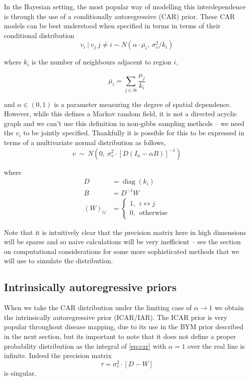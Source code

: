 \documentclass[11pt]{report}
\begin{document}
In the Bayesian setting, the most popular way of modelling this interdependence is through the use of a conditionally autoregressive (CAR) prior. These CAR models can be best understood when specified in terms in terms of their conditional distribution
\begin{equation}
v_i \ | \ v_j \ j \neq i \sim N(\alpha \cdot \bar{\mu_i}, \ \sigma_v^2/k_i)
\end{equation}

where $k_i$ is the number of neighbours adjacent to region $i$,

\begin{equation}
\bar{\mu}_i = \sum_{j \in \partial i} \frac{\mu_j}{k_i}
\end{equation}

and $\alpha \in (0, 1)$ is a parameter measuring the degree of spatial dependence. \\

However, while this defines a Markov random field, it is not a directed acyclic graph and we can't use this definition in non-gibbs sampling methods -- we need the $v_i$ to be jointly specified. Thankfully it is possible \citep{banerjeebook} for this to be expressed in terms of a multivariate normal distribution as follows,
\begin{equation} \label{eq:car}
v \ \sim \ N(0, \ \sigma_v^2 \cdot {[D(I_n - \alpha B)]}^{-1})
\end{equation}

where
\begin{align}
D &= \operatorname{diag}(k_i)  \\
B &= D^{-1} W \\
{(W)}_{ij} &= 
\begin{cases}
1, \ \ i \leftrightarrow j \\
0, \ \ \textrm{otherwise}
\end{cases}
\end{align} 

Note that it is intuitively clear that the precision matrix here in high dimensions will be sparse and so naive calculations will be very inefficient -- see the section on computational considerations for some more sophisticated methods that we will use to simulate the distribution.

\subsection{Intrinsically autoregressive priors}

When we take the CAR distribution under the limiting case of $\alpha \to 1$ we obtain the intrinsically autoregressive prior (ICAR/IAR). The ICAR prior is very popular throughout disease mapping, due to its use in the BYM prior described in the next section, but its important to note that it does not define a proper probability distribution as the integral of \ref{eq:car} with $\alpha = 1$ over the real line is infinite. Indeed the precision matrix
\begin{equation}
\tau = \sigma_v^2 \cdot [D - W]
\end{equation}
is singular. \\
\end{document}

